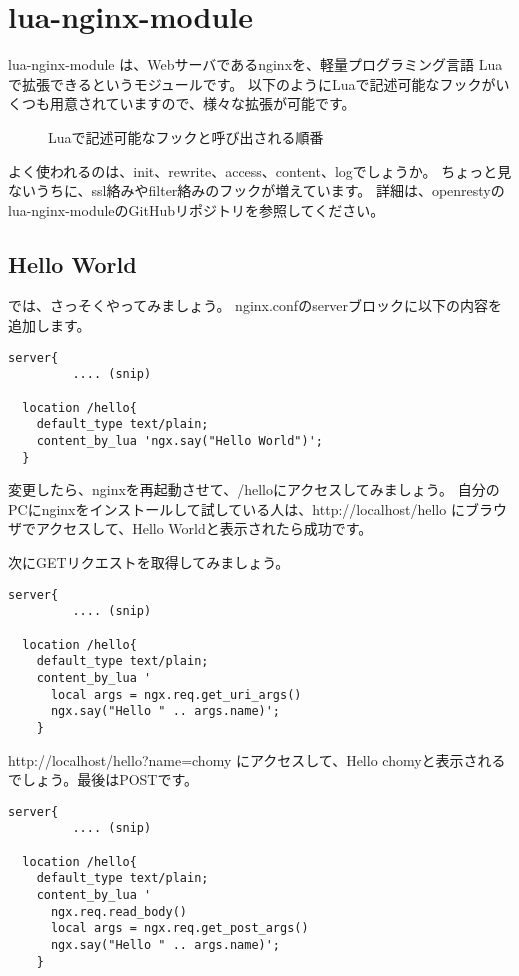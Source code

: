 \chapter*{lua-nginx-module}

lua-nginx-module は、Webサーバであるnginxを、軽量プログラミング言語
Luaで拡張できるというモジュールです。
以下のようにLuaで記述可能なフックがいくつも用意されていますので、様々な拡張が可能です。

\begin{figure}
\caption{Luaで記述可能なフックと呼び出される順番}
\end{figure}

よく使われるのは、init、rewrite、access、content、logでしょうか。
ちょっと見ないうちに、ssl絡みやfilter絡みのフックが増えています。
詳細は、openrestyのlua-nginx-moduleのGitHubリポジトリを参照してください。

\section*{Hello World}
では、さっそくやってみましょう。
nginx.confのserverブロックに以下の内容を追加します。
\begin{lstlisting}[caption=hello world,label=list:hello-world]
server{
         .... (snip)

  location /hello{
    default_type text/plain;
    content_by_lua 'ngx.say("Hello World")';
  }
\end{lstlisting}

変更したら、nginxを再起動させて、/helloにアクセスしてみましょう。
自分のPCにnginxをインストールして試している人は、http://localhost/hello
にブラウザでアクセスして、Hello Worldと表示されたら成功です。

次にGETリクエストを取得してみましょう。
\begin{lstlisting}[caption=GETパラメータの取得,label=list:get]
server{
         .... (snip)

  location /hello{
    default_type text/plain;
    content_by_lua '
      local args = ngx.req.get_uri_args()
      ngx.say("Hello " .. args.name)';
    }
\end{lstlisting}
http://localhost/hello?name=chomy にアクセスして、Hello chomyと表示される
でしょう。最後はPOSTです。
\begin{lstlisting}[caption=POSTパラメータの取得,label=list:get]
server{
         .... (snip)

  location /hello{
    default_type text/plain;
    content_by_lua '
      ngx.req.read_body()
      local args = ngx.req.get_post_args()
      ngx.say("Hello " .. args.name)';
    }
\end{lstlisting}

